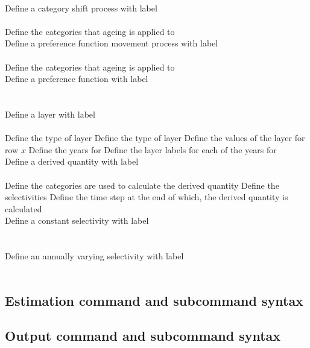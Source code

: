 \\  {Define a category shift process with label}\\ \\
 {Define the categories that ageing is applied to}
\\  {Define a preference function movement process with label}\\ \\
 {Define the categories that ageing is applied to}
\\  {Define a preference function with label}\\ \\
\\  {Define a layer with label}\\ \\
 {Define the type of layer}
 {Define the type of layer}
 {Define the values of the layer for row $x$}
 {Define the years for }
 {Define the layer labels for each of the years for }
\\  {Define a derived quantity with label}\\ \\
 {Define the categories are used to calculate the derived quantity}
 {Define the selectivities}
 {Define the time step at the end of which, the derived quantity is calculated}
\\  {Define a constant selectivity with label}\\ \\
\\  {Define an annually varying selectivity with label}\\ \\
\subsection*{Estimation command and subcommand syntax}
\subsection*{Output command and subcommand syntax}
